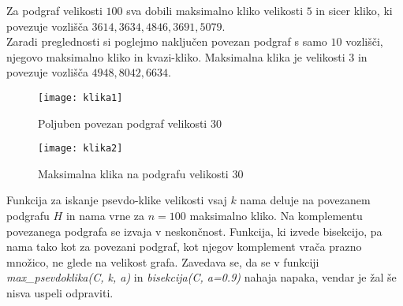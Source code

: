 \documentclass[12pt,a4paper]{amsart}
\theoremstyle{definition}
\theoremstyle{plain}
\begin{document}
Za podgraf velikosti $100$ sva dobili maksimalno kliko velikosti $5$ in sicer kliko, ki povezuje vozlišča $3614, 3634, 4846, 3691, 5079$.\\

Zaradi preglednosti si poglejmo naključen povezan podgraf s samo $10$ vozlišči, njegovo maksimalno kliko in kvazi-kliko.
Maksimalna klika je velikosti $3$ in povezuje vozlišča $4948, 8042, 6634$. 

\begin{figure}[h]
\caption{Poljuben povezan podgraf velikosti 30}
\centering
\texttt{[image: klika1]}
\end{figure}

\begin{figure}[h]
\caption{Maksimalna klika na podgrafu velikosti 30}
\centering
\texttt{[image: klika2]}
\end{figure}

Funkcija za iskanje psevdo-klike velikosti vsaj $k$ nama deluje na povezanem podgrafu $H$ in nama vrne za $n=100$ maksimalno kliko. Na komplementu povezanega podgrafa se izvaja v neskončnost. Funkcija, ki izvede bisekcijo, pa nama tako kot za povezani podgraf, kot njegov komplement vrača prazno množico, ne glede na velikost grafa. Zavedava se, da se v funkciji \textit{max\_psevdoklika(C, k, a)} in \textit{bisekcija(C, a=0.9)} nahaja napaka, vendar je žal še nisva uspeli odpraviti.
\end{document}
